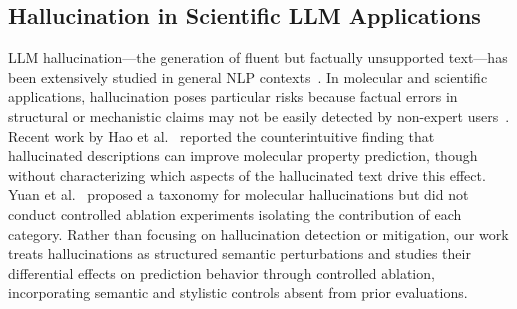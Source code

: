 \subsection{Hallucination in Scientific LLM Applications}
LLM hallucination---the generation of fluent but factually unsupported text---has been extensively studied in general NLP contexts~\cite{ji2023survey, huang2023survey}. In molecular and scientific applications, hallucination poses particular risks because factual errors in structural or mechanistic claims may not be easily detected by non-expert users~\cite{ramos2024review}. Recent work by Hao et al.~\cite{hao2024hallucination} reported the counterintuitive finding that hallucinated descriptions can improve molecular property prediction, though without characterizing which aspects of the hallucinated text drive this effect. Yuan et al.~\cite{yuan2025taxonomy} proposed a taxonomy for molecular hallucinations but did not conduct controlled ablation experiments isolating the contribution of each category. Rather than focusing on hallucination detection or mitigation, our work treats hallucinations as structured semantic perturbations and studies their differential effects on prediction behavior through controlled ablation, incorporating semantic and stylistic controls absent from prior evaluations.
